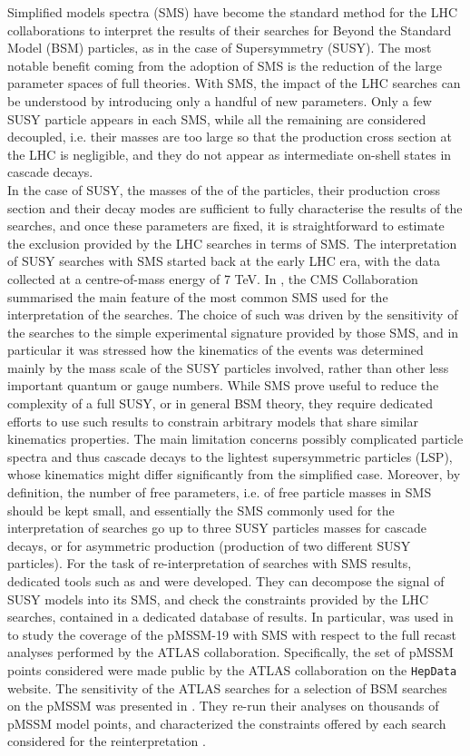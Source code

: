 \documentclass[epj,nopacs,fleqn]{svjour}
\begin{document}
Simplified models spectra (SMS) have become the standard method for the LHC collaborations to interpret the results of their searches for Beyond the Standard Model (BSM) particles, as in the case of Supersymmetry (SUSY). The most notable benefit coming from the adoption of SMS is the  reduction of the large parameter spaces of full theories. With SMS, the impact of the LHC searches can be understood by introducing only a handful of new parameters. Only a few SUSY particle appears in each SMS, while all the remaining are considered decoupled, i.e. their masses are too large so that the production cross section at the LHC is negligible, and they do not appear as intermediate on-shell states in cascade decays. 
\\

In the case of SUSY, the masses of the of the particles, their production cross section and their decay modes are sufficient to fully characterise the results of the searches, and once these parameters are fixed, it is straightforward to estimate the exclusion provided by the LHC searches in terms of SMS. The interpretation of SUSY searches with SMS started back at the early LHC era, with the data collected at a centre-of-mass energy of 7 TeV. In \cite{Chatrchyan:2013sza}, the CMS Collaboration summarised the main feature of the most common SMS used for the interpretation of the searches. The choice of such was driven by the sensitivity of the searches to the simple experimental signature provided by those SMS, and in particular it was stressed how the kinematics of the events was determined mainly by the mass scale of the SUSY particles involved, rather than other less important quantum or gauge numbers. While SMS prove useful to reduce the complexity of a full SUSY, or in general BSM theory, they require dedicated efforts to use such results to constrain arbitrary models that share similar kinematics properties. The main limitation concerns possibly complicated particle spectra and thus cascade decays to the lightest supersymmetric particles (LSP), whose kinematics might differ significantly from the simplified case. Moreover, by definition, the number of free parameters, i.e. of free particle masses in SMS should be kept small, and essentially the SMS commonly used for the interpretation of searches go up to three SUSY particles masses for cascade decays, or for asymmetric production (production of two different SUSY particles).
For the task of re-interpretation of searches with SMS results, 
dedicated tools such as \FASTLIM\cite{Papucci:2014rja} and \SMO\cite{Kraml:2014sna} were developed. They can decompose the signal of SUSY models into its SMS, and check the constraints provided by the LHC searches, contained in a dedicated database of results. In particular, \SMO was used in \cite{Ambrogi:2017lov} to study the coverage of the pMSSM-19 with SMS with respect to the full recast analyses performed by the ATLAS collaboration. Specifically, the set of pMSSM points considered were made public by the ATLAS collaboration on the \texttt{HepData} website\cite{ATLASpMSSMhepdata}. The sensitivity of the ATLAS searches for a selection of BSM searches on the pMSSM was presented in \cite{Aad:2015baa}. They re-run their analyses on thousands of pMSSM model points, and characterized the constraints offered by each search considered for the reinterpretation .
\end{document}
